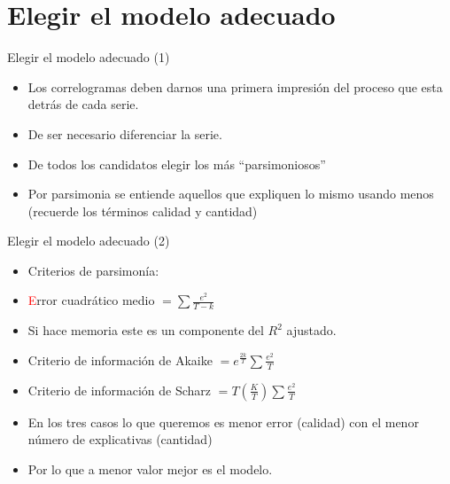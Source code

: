 \section{Elegir el modelo adecuado}
\begin{frame}{Elegir el modelo adecuado (1)}
	\begin{itemize}
		\item Los correlogramas deben darnos una primera impresión del proceso que esta detrás de cada serie.
		\item De ser necesario diferenciar la serie.
		\item De todos los candidatos elegir los más ``parsimoniosos''
		\item Por parsimonia se entiende aquellos que expliquen lo mismo usando menos (recuerde los términos calidad y cantidad)
	\end{itemize}
\end{frame}
\begin{frame}{Elegir el modelo adecuado (2)}
	\begin{itemize}
		\item Criterios de parsimonía:
		\item \textcolor{red}Error cuadrático medio $= \sum \frac{e^2}{T-k}$
		\item Si hace memoria este es un componente del $R^2$ ajustado.
		\item Criterio de información de Akaike $= e^{\frac{2k}{T}}\sum \frac{e^2}{T}$
		\item Criterio de información de Scharz $=T\left( \frac{K}{T}\right)\sum \frac{e^2}{T}$
		\item En los tres casos lo que queremos es menor error (calidad) con el menor número de explicativas (cantidad)
		\item Por lo que a menor valor mejor es el modelo.
	\end{itemize}
\end{frame}